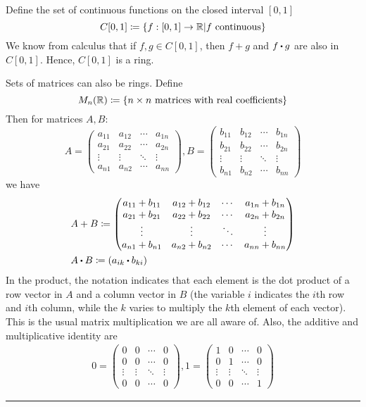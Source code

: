 \documentclass[../Main.tex]{subfiles}
\begin{document}
\begin{example}
	Define the set of continuous functions on the closed interval $[0,1]$ \[C[0,1] \coloneqq \{f:[0,1] \to \mathbb{R}| f \,\,\textrm{continuous}\}\]
	We know from calculus that if $f,g \in C[0,1]$, then $f+g$ and $f\rdot g$ are also in $C[0,1]$. 
	\newline Hence, $C[0,1]$ is a ring.
\end{example}
\begin{example}
	Sets of matrices can also be rings. Define
	\[M_n(\mathbb{R}) \coloneqq \{n \times n \,\, \textrm{matrices with real coefficients}\}\]
	Then for matrices $A, B$:
	\[A=\begin{pmatrix} a_{11} & a_{12} & \cdots & a_{1n}\\ a_{21} & a_{22} & \cdots & a_{2n}\\ \vdots & \vdots & \ddots & \vdots\\ a_{n1} & a_{n2} & \cdots & a_{nn} \end{pmatrix}, B=\begin{pmatrix} b_{11} & b_{12} & \cdots & b_{1n}\\ b_{21} & b_{22} & \cdots & b_{2n}\\ \vdots & \vdots & \ddots & \vdots\\ b_{n1} & b_{n2} & \cdots & b_{nn} \end{pmatrix}
	\]
	we have
	\begin{align*}
		&A+B \coloneqq \begin{pmatrix} a_{11}+b_{11} & a_{12}+b_{12} & \cdots & a_{1n}+b_{1n}\\ a_{21}+b_{21} & a_{22}+b_{22} & \cdots & a_{2n}+b_{2n}\\ \vdots & \vdots & \ddots & \vdots\\ a_{n1}+b_{n1} & a_{n2}+b_{n2} & \cdots & a_{nn}+b_{nn} \end{pmatrix}\\
		&A \rdot B \coloneqq \left(a_{ik}\rdot b_{ki}\right)
	\end{align*} 
	In the product, the notation indicates that each element is the dot product of a row vector in $A$ and a column vector in $B$ (the variable $i$ indicates the $i$th row and $i$th column, while the $k$ varies to multiply the $k$th element of each vector). This is the usual matrix multiplication we are all aware of.
	\newline Also, the additive and multiplicative identity are
	\begin{align*}
		0 = \begin{pmatrix} 0 & 0 & \cdots & 0\\ 0 & 0 & \cdots &0\\ \vdots & \vdots & \ddots & \vdots\\ 0 & 0 & \cdots & 0 \end{pmatrix}, 1 =
		\begin{pmatrix} 1 & 0 & \cdots & 0\\ 0 & 1 & \cdots &0\\ \vdots & \vdots & \ddots & \vdots\\ 0 & 0 & \cdots & 1 \end{pmatrix}
	\end{align*}
\noindent\rule{\textwidth}{1pt}
\end{example}
\end{document}

